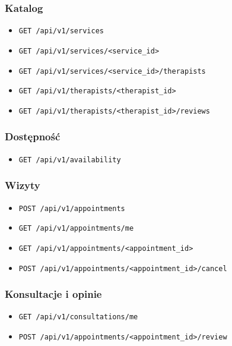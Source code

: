 \documentclass[11pt,a4paper]{article}
\begin{document}
\subsubsection*{Katalog}
\begin{itemize}[leftmargin=1.2cm]
    \item \texttt{GET /api/v1/services}
    \item \texttt{GET /api/v1/services/<service\_id>}
    \item \texttt{GET /api/v1/services/<service\_id>/therapists}
    \item \texttt{GET /api/v1/therapists/<therapist\_id>}
    \item \texttt{GET /api/v1/therapists/<therapist\_id>/reviews}
\end{itemize}

\subsubsection*{Dostępność}
\begin{itemize}[leftmargin=1.2cm]
    \item \texttt{GET /api/v1/availability}
\end{itemize}

\subsubsection*{Wizyty}
\begin{itemize}[leftmargin=1.2cm]
    \item \texttt{POST /api/v1/appointments}
    \item \texttt{GET /api/v1/appointments/me}
    \item \texttt{GET /api/v1/appointments/<appointment\_id>}
    \item \texttt{POST /api/v1/appointments/<appointment\_id>/cancel}
\end{itemize}

\subsubsection*{Konsultacje i opinie}
\begin{itemize}[leftmargin=1.2cm]
    \item \texttt{GET /api/v1/consultations/me}
    \item \texttt{POST /api/v1/appointments/<appointment\_id>/review}
\end{itemize}
\end{document}
